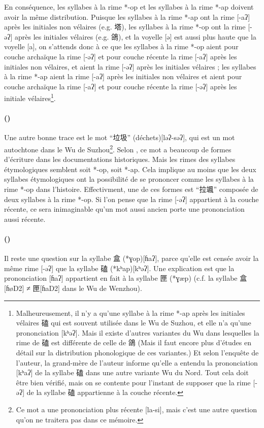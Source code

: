 \documentclass{scrbook}
\newcounter{c}[subsubsection]
\newcommand{\stpc}[1]{\stepcounter{#1}}
\begin{document}
\begin{sloppypar}
En conséquence, les syllabes à la rime *-op et les syllabes à la rime *-ap doivent avoir la même distribution. Puisque les syllabes à la rime *-ap ont la rime [-aʔ] après les initiales non vélaires (e.g. 塔), les syllabes à la rime *-op ont la rime [-əʔ] après les initiales vélaires (e.g. 鴿), et la voyelle [ə] est aussi plus haute que la voyelle [a],  on s'attends donc à ce que les syllabes à la rime *-op aient pour couche archaïque la rime [-əʔ] et pour couche récente la rime [-aʔ] après les initiales non vélaires, et aient la rime [-əʔ] après les initiales vélaires ; les syllabes à la rime *-ap aient la rime [-aʔ] après les initiales non vélaires et aient pour couche archaïque la rime [-aʔ] et pour couche récente la rime [-əʔ] après les initiale vélaires\footnote{Malheureusement, il n'y a qu'une syllabe à la rime *-ap après les initiales vélaires 磕 qui est souvent utilisée dans le Wu de Suzhou, et elle n'a qu'une prononciation [kʰəʔ]. Mais il existe d'autres variantes du Wu dans lesquelles la rime de 磕 est différente de celle de 鴿 (Mais il faut encore plus d'études en détail sur la distribution phonologique de ces variantes.) Et selon l'enquête de l'auteur, la grand-mère de l'auteur informe qu'elle a entendu la prononciation [kʰaʔ] de la syllabe 磕 dans une autre variante Wu du Nord. Tout cela doit être bien vérifié, mais on se contente pour l'instant de supposer que la rime [-əʔ] de la syllabe 磕 appartienne à la couche récente.}. 

\stpc{c}\paragraph{()}
Une autre bonne trace est le mot ``垃圾'' (déchets)[ləʔ-səʔ], qui est un mot autochtone dans le Wu de Suzhou\footnote{Ce mot a une prononciation plus récente [la-si], mais c'est une autre question qu'on ne traitera pas dans ce mémoire.}. Selon \textcite{Chen2016laji}, ce mot a beaucoup de formes d'écriture dans les documentations historiques. Mais les rimes des syllabes étymologiques semblent soit *-op, soit *-ap. Cela implique au moins que les deux syllabes étymologiques ont la possibilité de se prononcer comme les syllabes à la rime *-op dans l'histoire. Effectivment, une de ces formes est ``拉颯'' composée de deux syllabes à la rime *-op. Si l'on pense que la rime [-əʔ] appartient à la couche récente, ce sera inimaginable qu'un mot aussi ancien porte une prononciation aussi récente.

\stpc{c}\paragraph{()}
Il reste une question sur la syllabe 盒 (*ɣop)[ɦaʔ], parce qu'elle est censée avoir la même rime [-əʔ] que la syllabe 磕 (*kʰap)[kʰəʔ]. Une explication est que la prononciation [ɦaʔ] appartient en fait à la syllabe 匣 (*ɣæp) (c.f. la syllabe 盒[ɦøD2] ≠ 匣[ɦaD2] dans le Wu de Wenzhou). 


\end{sloppypar}
\end{document}
